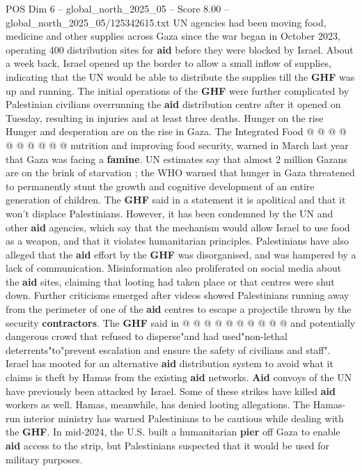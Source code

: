 \begin{textsample}{POS Dim 6 – global\_north\_2025\_05 – Score 8.00 – global\_north\_2025\_05/125342615.txt}
UN agencies had been moving food, medicine and other supplies across Gaza since the war began in October 2023, operating 400 distribution sites for \textbf{aid} before they were blocked by Israel.
About a week back, Israel opened up the border to allow a small inflow of supplies, indicating that the UN would be able to distribute the supplies till the \textbf{GHF} was up and running.
The initial operations of the \textbf{GHF} were further complicated by Palestinian civilians overrunning the \textbf{aid} distribution centre after it opened on Tuesday, resulting in injuries and at least three deaths.
Hunger on the rise Hunger and desperation are on the rise in Gaza.
The Integrated Food @ @ @ @ @ @ @ @ @ @ nutrition and improving food security, warned in March last year that Gaza was facing a \textbf{famine}.
UN estimates say that almost 2 million Gazans are on the brink of starvation ; the WHO warned that hunger in Gaza threatened to permanently stunt the growth and cognitive development of an entire generation of children.
The \textbf{GHF} said in a statement it is apolitical and that it won't displace Palestinians.
However, it has been condemned by the UN and other \textbf{aid} agencies, which say that the mechanism would allow Israel to use food as a weapon, and that it violates humanitarian principles.
Palestinians have also alleged that the \textbf{aid} effort by the \textbf{GHF} was disorganised, and was hampered by a lack of communication.
Misinformation also proliferated on social media about the \textbf{aid} sites, claiming that looting had taken place or that centres were shut down.
Further criticisms emerged after videos showed Palestinians running away from the perimeter of one of the \textbf{aid} centres to escape a projectile thrown by the security \textbf{contractors}.
The \textbf{GHF} said in @ @ @ @ @ @ @ @ @ @ and potentially dangerous crowd that refused to disperse"and had used"non-lethal deterrents"to"prevent escalation and ensure the safety of civilians and staff".
Israel has mooted for an alternative \textbf{aid} distribution system to avoid what it claims is theft by Hamas from the existing \textbf{aid} networks. \textbf{Aid} convoys of the UN have previously been attacked by Israel.
Some of these strikes have killed \textbf{aid} workers as well.
Hamas, meanwhile, has denied looting allegations.
The Hamas-run interior ministry has warned Palestinians to be cautious while dealing with the \textbf{GHF}.
In mid-2024, the U.S. built a humanitarian \textbf{pier} off Gaza to enable \textbf{aid} access to the strip, but Palestinians suspected that it would be used for military purposes.

\end{textsample}
